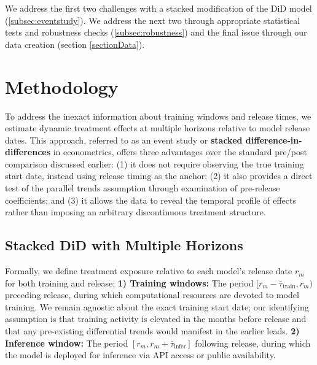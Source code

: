\documentclass[sigconf,authordraft]{acmart}
\begin{document}
We address the first two challenges with a stacked modification of the DiD model (\autoref{subsec:eventstudy}). We address the next two through appropriate statistical tests and robustness checks (\autoref{subsec:robustness}) and the final issue through our data creation (section \ref{sectionData}). 


\section{Methodology} 

To address the inexact information about training windows and release times, we estimate dynamic treatment effects at multiple horizons relative to model release dates. This approach, referred to as an event study or \textbf{stacked difference-in-differences} in econometrics, offers three advantages over the standard pre/post comparison discussed earlier: (1) it does not require observing the true training start date, instead using release timing as the anchor; (2) it also provides a direct test of the parallel trends assumption through examination of pre-release coefficients; and (3) it allows the data to reveal the temporal profile of effects rather than imposing an arbitrary discontinuous treatment structure.

\subsection{Stacked DiD with Multiple Horizons}%
\label{subsec:eventstudy}
Formally, we define treatment exposure relative to each model's release date $r_m$ for both training and release: \textbf{1) Training windows:} The period $[r_m - \bar{\tau}_{\text{train}}, r_m)$ preceding release, during which computational resources are devoted to model training. We remain agnostic about the exact training start date; our identifying assumption is that training activity is elevated in the months before release and that any pre-existing differential trends would manifest in the earlier leads. \textbf{2) Inference window:} The period $[r_m, r_m + \bar{\tau}_{\text{infer}}]$ following release, during which the model is deployed for inference via API access or public availability.
\end{document}
